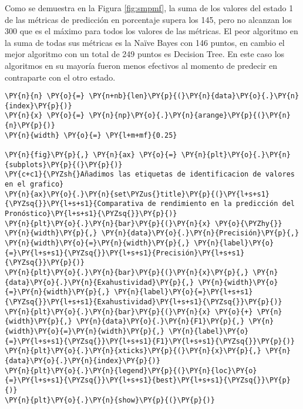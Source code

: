     Como se demuestra en la Figura \ref{fig:smpmf}, la suma de los valores del estado 1 de las métricas de predicción en porcentaje supera los 145, pero no alcanzan los 300 que es el máximo para todos los valores de las métricas. El peor algoritmo en la suma de todas sus métricas es la Naïve Bayes con 146 puntos, en cambio el mejor algoritmo con un total de 249 puntos es Decision Tree. En este caso los algoritmos en su mayoría fueron menos efectivos al momento de predecir en contraparte con el otro estado.

    \begin{tcolorbox}[breakable, size=fbox, boxrule=1pt, pad at break*=1mm,colback=cellbackground, colframe=cellborder]
\begin{Verbatim}[commandchars=\\\{\}]
\PY{n}{n} \PY{o}{=} \PY{n+nb}{len}\PY{p}{(}\PY{n}{data}\PY{o}{.}\PY{n}{index}\PY{p}{)}
\PY{n}{x} \PY{o}{=} \PY{n}{np}\PY{o}{.}\PY{n}{arange}\PY{p}{(}\PY{n}{n}\PY{p}{)}
\PY{n}{width} \PY{o}{=} \PY{l+m+mf}{0.25}

\PY{n}{fig}\PY{p}{,} \PY{n}{ax} \PY{o}{=} \PY{n}{plt}\PY{o}{.}\PY{n}{subplots}\PY{p}{(}\PY{p}{)}
\PY{c+c1}{\PYZsh{}Añadimos las etiquetas de identificacion de valores en el grafico}
\PY{n}{ax}\PY{o}{.}\PY{n}{set\PYZus{}title}\PY{p}{(}\PY{l+s+s1}{\PYZsq{}}\PY{l+s+s1}{Comparativa de rendimiento en la predicción del Pronóstico}\PY{l+s+s1}{\PYZsq{}}\PY{p}{)}
\PY{n}{plt}\PY{o}{.}\PY{n}{bar}\PY{p}{(}\PY{n}{x} \PY{o}{\PYZhy{}} \PY{n}{width}\PY{p}{,} \PY{n}{data}\PY{o}{.}\PY{n}{Precisión}\PY{p}{,} \PY{n}{width}\PY{o}{=}\PY{n}{width}\PY{p}{,} \PY{n}{label}\PY{o}{=}\PY{l+s+s1}{\PYZsq{}}\PY{l+s+s1}{Precisión}\PY{l+s+s1}{\PYZsq{}}\PY{p}{)}
\PY{n}{plt}\PY{o}{.}\PY{n}{bar}\PY{p}{(}\PY{n}{x}\PY{p}{,} \PY{n}{data}\PY{o}{.}\PY{n}{Exahustividad}\PY{p}{,} \PY{n}{width}\PY{o}{=}\PY{n}{width}\PY{p}{,} \PY{n}{label}\PY{o}{=}\PY{l+s+s1}{\PYZsq{}}\PY{l+s+s1}{Exahustividad}\PY{l+s+s1}{\PYZsq{}}\PY{p}{)}
\PY{n}{plt}\PY{o}{.}\PY{n}{bar}\PY{p}{(}\PY{n}{x} \PY{o}{+} \PY{n}{width}\PY{p}{,} \PY{n}{data}\PY{o}{.}\PY{n}{F1}\PY{p}{,} \PY{n}{width}\PY{o}{=}\PY{n}{width}\PY{p}{,} \PY{n}{label}\PY{o}{=}\PY{l+s+s1}{\PYZsq{}}\PY{l+s+s1}{F1}\PY{l+s+s1}{\PYZsq{}}\PY{p}{)}
\PY{n}{plt}\PY{o}{.}\PY{n}{xticks}\PY{p}{(}\PY{n}{x}\PY{p}{,} \PY{n}{data}\PY{o}{.}\PY{n}{index}\PY{p}{)}
\PY{n}{plt}\PY{o}{.}\PY{n}{legend}\PY{p}{(}\PY{n}{loc}\PY{o}{=}\PY{l+s+s1}{\PYZsq{}}\PY{l+s+s1}{best}\PY{l+s+s1}{\PYZsq{}}\PY{p}{)}
\PY{n}{plt}\PY{o}{.}\PY{n}{show}\PY{p}{(}\PY{p}{)}
\end{Verbatim}
\end{tcolorbox}


